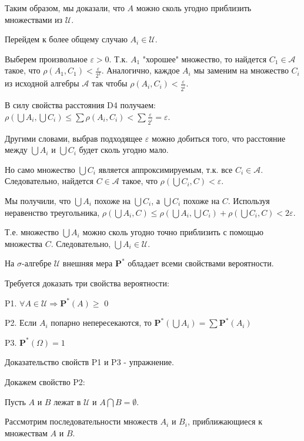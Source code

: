 {Таким образом, мы доказали, что $A$ можно сколь угодно приблизить
множествами из $\mathcal{U}$.

Перейдем к более общему случаю $A_{i}\in\mathcal{U}$.

Выберем произвольное $\varepsilon>0$. Т.к. $A_{1}$ "хорошее"
множество, то найдется $C_{1}\in \mathcal{A}$ такое, что
$\rho(A_{1},C_{1})<\frac{\varepsilon}{2^{1}}$. Аналогично, каждое
$A_{i}$ мы заменим на множество $C_{i}$ из исходной алгебры
$\mathcal{A}$ так чтобы
$\rho(A_{i},C_{i})<\frac{\varepsilon}{2^{i}}$.

В силу свойства расстояния D4 получаем: $\rho(\bigcup
A_{i},\bigcup C_{i})\leq \sum \rho(A_{i},C_{i})<\sum
\frac{\varepsilon}{2^{i}}=\varepsilon $.

Другими словами, выбрав подходящее $\varepsilon$ можно добиться
того, что расстояние между $\bigcup A_{i}$ и $\bigcup C_{i}$ будет
сколь угодно мало.

Но само множество $\bigcup C_{i}$ является аппроксимируемым, т.к.
все $C_{i} \in \mathcal{A}$. Следовательно, найдется $C \in
\mathcal{A}$ такое, что $\rho(\bigcup C_{i},C)<\varepsilon$.

Мы получили, что $\bigcup A_{i}$ похоже на $\bigcup C_{i}$, а
$\bigcup C_{i}$ похоже на $C$. Используя неравенство треугольника,
$\rho(\bigcup A_{i},C)\leq \rho(\bigcup A_{i},\bigcup
C_{i})+\rho(\bigcup C_{i},C) < 2\varepsilon$.

Т.е. множество $\bigcup A_{i}$ можно сколь угодно точно приблизить
с помощью множества $C$. Следовательно, $\bigcup A_{i} \in
\mathcal{U}$.

\begin{myth}
На $\sigma$-алгебре $\mathcal{U}$ внешняя мера $\mathbf{P^{*}}$
обладает всеми свойствами вероятности.
\end{myth}
Требуется доказать три свойства вероятности:

P1. $\forall A\in \mathcal{U}\Rightarrow \mathbf{P^{*}}(A)\geq$
$0$

P2. Если $A_{i}$ попарно непересекаются, то
$\mathbf{P^{*}}(\bigcup A_{i})=\sum \mathbf{P^{*}}(A_{i})$

P3. $\mathbf{P^{*}}(\Omega)=1$

Доказательство свойств P1 и P3 - упражнение.

Докажем свойство P2:

Пусть $A$ и $B$ лежат в $\mathcal{U}$ и $A \bigcap B=\emptyset$.

Рассмотрим последовательности множеств $A_{i}$ и $B_{i}$,
приближающиеся к множествам $A$ и $B$.

}
